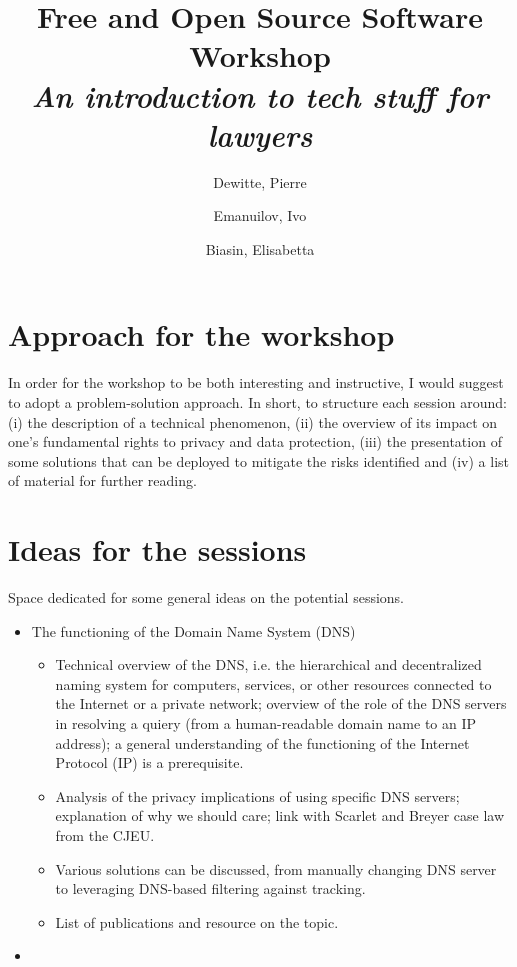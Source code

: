 \documentclass[11pt, a4paper]{article}
\title{Free and Open Source Software Workshop\\\large\textit{An introduction to tech stuff for lawyers}}
\author{Dewitte, Pierre \and Emanuilov, Ivo \and Biasin, Elisabetta}
\begin{document}
\maketitle

\section{Approach for the workshop}

In order for the workshop to be both interesting and instructive, I would suggest to adopt a problem-solution approach. In short, to structure each session around: (i) the description of a technical phenomenon, (ii) the overview of its impact on one's fundamental rights to privacy and data protection, (iii) the presentation of some solutions that can be deployed to mitigate the risks identified and (iv) a list of material for further reading.

\section{Ideas for the sessions}

Space dedicated for some general ideas on the potential sessions.

\begin{itemize}
    \item The functioning of the Domain Name System (DNS)
    \begin{itemize}
        \item Technical overview of the DNS, i.e. the hierarchical and decentralized naming system for computers, services, or other resources connected to the Internet or a private network; overview of the role of the DNS servers in resolving a quiery (from a human-readable domain name to an IP address); a general understanding of the functioning of the Internet Protocol (IP) is a prerequisite. 
        \item Analysis of the privacy implications of using specific DNS servers; explanation of why we should care; link with Scarlet and Breyer case law from the CJEU.
        \item Various solutions can be discussed, from manually changing DNS server to leveraging DNS-based filtering against tracking.
        \item List of publications and resource on the topic.
    \end{itemize}
    \item 
\end{itemize}
\end{document}

